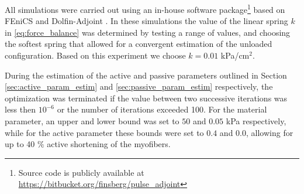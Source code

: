 All simulations were carried out using an in-house software
package\footnote{Source code is publicly available at
  \url{https://bitbucket.org/finsberg/pulse_adjoint}} 
based on FEniCS \cite{logg2012automated} and Dolfin-Adjoint \cite{farrell2013automated}.
In these simulations the value of the linear spring $k$ in
\eqref{eq:force_balance} was determined by testing a range of values,
and choosing the softest spring that allowed for a convergent
estimation of the unloaded configuration. Based on this experiment we
choose $k=0.01$ kPa/cm$^2$.

During the estimation of the active and passive parameters outlined in Section
\ref{sec:active_param_estim} and \ref{sec:passive_param_estim}
respectively, the optimization was terminated if the value between two
successive iterations was less then $10^{-6}$ or the number of
iterations exceeded 100. For the material parameter, an upper and lower
bound was set to $50$ and $0.05$ kPa respectively, while for the active
parameter these bounds were set to $0.4$ and $0.0$, allowing for up to
40 $\%$ active shortening of the myofibers. 




